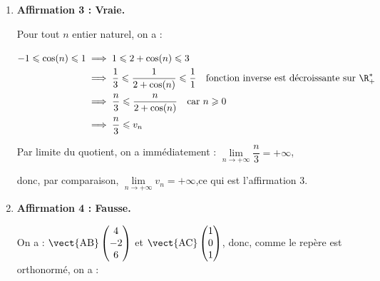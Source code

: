 \begin{enumerate}
	3 filles choisies parmi les 18 de la classe : il y a $\displaystyle \binom{18}{3} = 816$ façons de choisir les trois filles qui constitueront ce premier ensemble.

	Le deuxième élément du couple sera un ensemble de trois élèves garçons, choisis avec les même principes.

	3 garçons choisis parmi les 14 de la classe : il y a $\displaystyle \binom{14}{3} = 364$ façons de choisir les trois garçons qui constitueront ce second ensemble.

	Finalement, par principe multiplicatif, une équipe est un ensemble de trois filles choisi parmi les 816 ensembles possibles, associé à un ensemble de garçons parmi les 364 ensembles possibles : il y a donc $\quad816 \times 364 = \np{297024}$ équipes différentes possibles.

	\item \textbf{Affirmation 3 : Vraie.}

	Pour tout $n$ entier naturel, on a :

	$\begin{aligned}[t]
		-1 \leqslant \cos(n) \leqslant 1 &\implies 1\leqslant 2 + \cos(n) \leqslant 3\\
		&\implies \dfrac{1}{3} \leqslant \dfrac{1}{2+\cos(n)} \leqslant \dfrac{1}{1}\quad\text{fonction inverse est décroissante sur } \R_{+}^{*}\\
		&\implies \dfrac{n}{3} \leqslant \dfrac{n}{2 + \cos(n)}\quad \text{car } n\geqslant 0\\
		&\implies \dfrac{n}{3} \leqslant v_n
	\end{aligned}$

	Par limite du quotient, on a immédiatement : \quad$\lim\limits_{n \to +\infty} \dfrac{n}{3} = +\infty$,

	donc, par comparaison, \quad $\lim\limits_{n \to +\infty} v_n = +\infty$,\quad ce qui est l'affirmation 3.

	\item \textbf{Affirmation 4 : Fausse.}

	On a : $\vect{\mathrm{AB}}\begin{pmatrix}4\\-2\\6\end{pmatrix}$ et $\vect{\mathrm{AC}}\begin{pmatrix}1\\0\\1\end{pmatrix}$,
	donc, comme le repère est orthonormé, on a :


\end{enumerate}
